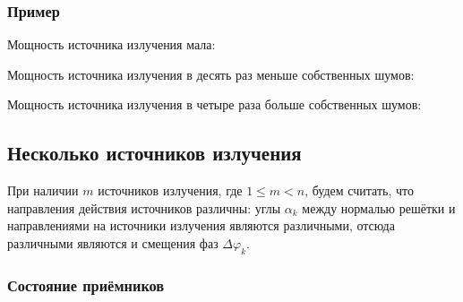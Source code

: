 \subsubsection{Пример}

Мощность источника излучения мала:

Мощность источника излучения в десять раз меньше собственных шумов:

Мощность источника излучения в четыре раза больше собственных шумов:

\subsection{Несколько источников излучения}

При наличии $m$ источников излучения, где $1 \le m < n$, будем считать, что направления действия источников различны: углы $\alpha_k$ между нормалью решётки и направлениями
на источники излучения являются различными, отсюда различными являются и смещения фаз $\Delta \varphi_k$.

\subsubsection{Состояние приёмников}

